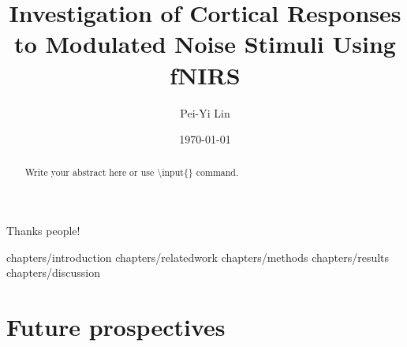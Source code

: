 \documentclass[a4paper, 12pt, twoside]{report}
\author{Pei-Yi Lin}
\title{Investigation of Cortical Responses to Modulated Noise Stimuli Using fNIRS}
\date{\today}
\begin{document}
\maketitle{}


\begin{abstract}
  Write your abstract here or use \textbackslash{}input\{\} command.

  
\end{abstract}
\cleardoublepage{}


\begin{acknowledgments}
Thanks people!
\end{acknowledgments}


% 



\cleardoublepage{}
\tableofcontents
\cleardoublepage{}



%

 {chapters/introduction}
 {chapters/relatedwork}
 {chapters/methods}
 {chapters/results}
 {chapters/discussion}
\chapter{Future prospectives}

\appendix{}
%


\listoffigures{}
\listoftables{}




\nocite{*}
\cleardoublepage{}


\erklaerung{}
\end{document}
